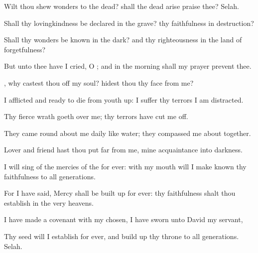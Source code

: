 {\Q {}Wilt thou
shew
wonders to the
dead? shall the
dead
arise
{}
praise thee?
Selah.


\par }{\Q {}Shall thy
lovingkindness be
declared in the
grave?
{} thy
faithfulness in
destruction?


\par }{\Q {}Shall thy
wonders be
known in the
dark? and thy
righteousness in the
land of
forgetfulness?


\par }{\Q {}But unto thee have I
cried, O
{}; and in the
morning shall my
prayer
prevent thee.


\par }{\Q {}, why castest thou
off my
soul?
{}
hidest thou thy
face from me?


\par }{\Q {}I
{}
afflicted and ready to
die from
{}
youth up:
{} I
suffer thy
terrors I am
distracted.


\par }{\Q {}Thy fierce
wrath goeth
over me; thy
terrors have cut me
off.


\par }{\Q {}They came round
about me
daily like
water; they
compassed me about
together.


\par }{\Q {}Lover and
friend hast thou put
far from me,
{} mine
acquaintance into
darkness.




\par }
{\Q {}I will
sing of the
mercies of the
{} for
ever: with my
mouth will I make
known thy
faithfulness to
all
generations.


\par }{\Q {}For I have
said,
Mercy shall be built
up for
ever: thy
faithfulness shalt thou
establish in the very
heavens.


\par }{\Q {}I have
made a
covenant with my
chosen, I have
sworn unto
David my
servant,


\par }{\Q {}Thy
seed will I
establish
for
ever, and build
up thy
throne to
all
generations.
Selah.


\par }{\BB \par }
